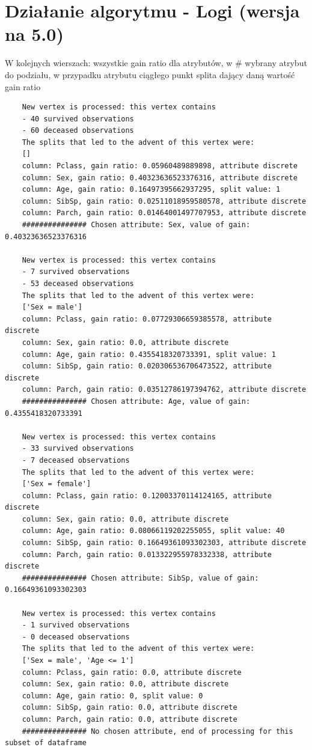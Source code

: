 \documentclass[12pt]{article}
\begin{document}
\section{Działanie algorytmu - Logi (wersja na 5.0)}
W kolejnych wierszach: wszystkie gain ratio dla atrybutów, w \# wybrany atrybut do podziału, w przypadku atrybutu ciągłego punkt splita dający daną wartość gain ratio
\begin{verbatim}
	New vertex is processed: this vertex contains
	- 40 survived observations
	- 60 deceased observations
	The splits that led to the advent of this vertex were:
	[]
	column: Pclass, gain ratio: 0.05960489889898, attribute discrete
	column: Sex, gain ratio: 0.40323636523376316, attribute discrete
	column: Age, gain ratio: 0.16497395662937295, split value: 1
	column: SibSp, gain ratio: 0.02511018959580578, attribute discrete
	column: Parch, gain ratio: 0.01464001497707953, attribute discrete
	############### Chosen attribute: Sex, value of gain: 0.40323636523376316
	
	New vertex is processed: this vertex contains
	- 7 survived observations
	- 53 deceased observations
	The splits that led to the advent of this vertex were:
	['Sex = male']
	column: Pclass, gain ratio: 0.07729306659385578, attribute discrete
	column: Sex, gain ratio: 0.0, attribute discrete
	column: Age, gain ratio: 0.4355418320733391, split value: 1
	column: SibSp, gain ratio: 0.020306536706473522, attribute discrete
	column: Parch, gain ratio: 0.03512786197394762, attribute discrete
	############### Chosen attribute: Age, value of gain: 0.4355418320733391
	
	New vertex is processed: this vertex contains
	- 33 survived observations
	- 7 deceased observations
	The splits that led to the advent of this vertex were:
	['Sex = female']
	column: Pclass, gain ratio: 0.12003370114124165, attribute discrete
	column: Sex, gain ratio: 0.0, attribute discrete
	column: Age, gain ratio: 0.08066119202255055, split value: 40
	column: SibSp, gain ratio: 0.16649361093302303, attribute discrete
	column: Parch, gain ratio: 0.013322955978332338, attribute discrete
	############### Chosen attribute: SibSp, value of gain: 0.16649361093302303
	
	New vertex is processed: this vertex contains
	- 1 survived observations
	- 0 deceased observations
	The splits that led to the advent of this vertex were:
	['Sex = male', 'Age <= 1']
	column: Pclass, gain ratio: 0.0, attribute discrete
	column: Sex, gain ratio: 0.0, attribute discrete
	column: Age, gain ratio: 0, split value: 0
	column: SibSp, gain ratio: 0.0, attribute discrete
	column: Parch, gain ratio: 0.0, attribute discrete
	############### No chosen attribute, end of processing for this subset of dataframe
	

\end{verbatim}
\end{document}

